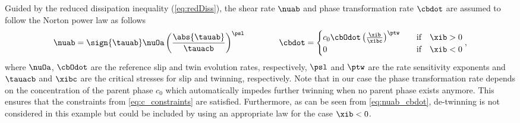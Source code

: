   Guided by the reduced dissipation inequality (\ref{eq:redDiss}), the shear rate $\nuab$ and phase transformation rate $\cbdot$ are assumed to follow the Norton power law as follows
  \begin{equation}
    \nuab = \sign{\tauab} \nuOa \left( \frac{\abs{\tauab}}{\tauacb} \right)^{\psl} \qquad \qquad \cbdot= 
    \begin{cases}
      c_0 \cbOdot \left( \frac{\xib}{\xibc} \right)^{\ptw} &\quad \text{if} \quad \xib > 0 \\
      0 &\quad \text{if} \quad \xib < 0
    \end{cases},
    \label{eq:nuab_cbdot}
  \end{equation}
  where $\nuOa$, $\cbOdot$ are the reference slip and twin evolution rates, respectively, $\psl$ and $\ptw$ are the rate sensitivity exponents and $\tauacb$ and $\xibc$ are the critical stresses for slip and twinning, respectively. Note that in our case the phase transformation rate depends on the concentration of the parent phase $c_0$ which automatically impedes further twinning when no parent phase exists anymore. This ensures that the constraints from \cref{eq:c_constraints} are satisfied. Furthermore, as can be seen from \cref{eq:nuab_cbdot}, de-twinning is not considered in this example but could be included by using an appropriate law for the case $\xib < 0$.

